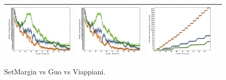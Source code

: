 \documentclass{article}
\renewcommand\[{\begin{equation}}
\renewcommand\]{\end{equation}}
\begin{document}
\begin{figure}[b]
{\begin{tabular}{cccc}
        \includegraphics[width=10em]{figures/loss} &
        \includegraphics[width=10em]{figures/loss} &
        \includegraphics[width=10em]{figures/time}
        \\
        \hline
    \end{tabular}
    }
    \caption{\label{fig:comparison} {\sc SetMargin} vs Guo vs Viappiani.}
\end{figure}
\end{document}
